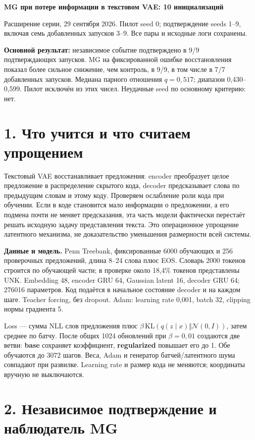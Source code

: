 \documentclass[10pt,a4paper]{article}
\begin{document}
{\Large\bfseries MG при потере информации в текстовом VAE: 10 инициализаций}\par\medskip

Расширение серии, 29 сентября 2026. Пилот seed 0; подтверждение seeds 1--9, включая семь добавленных запусков 3--9. Все пары и исходные логи сохранены.

\textbf{Основной результат:} независимое событие подтверждено в 9/9 подтверждающих запусков. MG на фиксированной ошибке восстановления показал более сильное снижение, чем контроль, в 9/9, в том числе в 7/7 добавленных запусков. Медиана парного отношения $q=0,517$; диапазон 0,430--0,599. Пилот исключён из этих чисел. Неудачные seed по основному критерию: нет.

\section*{1. Что учится и что считаем упрощением}

Текстовый VAE восстанавливает предложения: encoder преобразует целое предложение в распределение скрытого кода, decoder предсказывает слова по предыдущим словам и этому коду. Проверяем ослабление роли кода при обучении. Если в коде становится мало информации о предложении, а его подмена почти не меняет предсказания, эта часть модели фактически перестаёт решать исходную задачу представления текста. Это операционное упрощение латентного механизма, не доказательство уменьшения размерности всей системы.

\textbf{Данные и модель.} Penn Treebank, фиксированные 6000 обучающих и 256 проверочных предложений, длина 8--24 слова плюс EOS. Словарь 2000 токенов строится по обучающей части; в проверке около 18,4\% токенов представлены UNK. Embedding 48, encoder GRU 64, Gaussian latent 16, decoder GRU 64; 276016 параметров. Код подаётся в начальное состояние decoder и на каждом шаге. Teacher forcing, без dropout. Adam: learning rate 0,001, batch 32, clipping нормы градиента 5.

Loss --- сумма NLL слов предложения плюс $\beta\,\mathrm{KL}(q(z\mid x)\Vert\mathcal N(0,I))$, затем среднее по батчу. После общих 1024 обновлений при $\beta=0{,}01$ создаются две ветви: \textbf{base} сохраняет коэффициент, \textbf{regularized} повышает его до 1. Обе обучаются до 3072 шагов. Веса, Adam и генератор батчей/латентного шума совпадают при развилке. Learning rate и размер кода не меняются; координаты вручную не выключаются.

\section*{2. Независимое подтверждение и наблюдатель MG}
\end{document}
